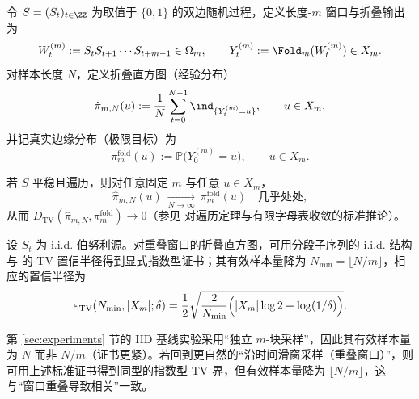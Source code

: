 \begin{definition}[一般源与折叠输出过程]\label{def:source-and-fold-output}
令 $S=(S_t)_{t\in\ZZ}$ 为取值于 $\{0,1\}$ 的双边随机过程，定义长度-$m$ 窗口与折叠输出为
\[
W_t^{(m)}:=S_tS_{t+1}\cdots S_{t+m-1}\in\Omega_m,
\qquad
Y_t^{(m)}:=\Fold_m(W_t^{(m)})\in X_m.
\]
对样本长度 $N$，定义折叠直方图（经验分布）
\[
\hat{\pi}_{m,N}(u):=\frac{1}{N}\sum_{t=0}^{N-1}\ind_{\{Y_t^{(m)}=u\}},
\qquad u\in X_m,
\]
并记真实边缘分布（极限目标）为
\[
\pi_m^{\mathrm{fold}}(u):=\mathbb{P}\bigl(Y_0^{(m)}=u\bigr),\qquad u\in X_m.
\]
\end{definition}

若 $S$ 平稳且遍历，则对任意固定 $m$ 与任意 $u\in X_m$，
\[
\hat{\pi}_{m,N}(u)\ \xrightarrow[N\to\infty]{}\ \pi_m^{\mathrm{fold}}(u)
\quad\text{几乎处处},
\]
从而 $D_{\mathrm{TV}}(\hat{\pi}_{m,N},\pi_m^{\mathrm{fold}})\to 0$（参见 \cite{WaltersErgodicTheory} 对遍历定理与有限字母表收敛的标准推论）。

设 $S_t$ 为 i.i.d. 伯努利源。对重叠窗口的折叠直方图，可用分段子序列的 i.i.d. 结构与 \cite{WeissmanEtAl2003L1Empirical} 的 TV 置信半径得到显式指数型证书；其有效样本量降为 $N_{\min}=\lfloor N/m\rfloor$，相应的置信半径为
\[
\varepsilon_{\mathrm{TV}}(N_{\min},|X_m|;\delta)=\frac12\sqrt{\frac{2}{N_{\min}}\Bigl(|X_m|\log 2+\log(1/\delta)\Bigr)}.
\]

\begin{remark}\label{rem:iid-overlap-vs-blocks}
第 \ref{sec:experiments} 节的 IID 基线实验采用“独立 $m$-块采样”，因此其有效样本量为 $N$ 而非 $N/m$（证书更紧）。若回到更自然的“沿时间滑窗采样（重叠窗口）”，则可用上述标准证书得到同型的指数型 TV 界，但有效样本量降为 $\lfloor N/m\rfloor$，这与“窗口重叠导致相关”一致。
\end{remark}
